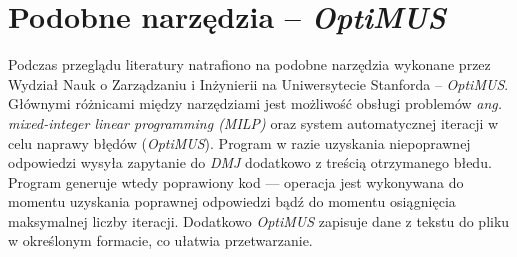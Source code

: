 \section{Podobne narzędzia -- \textit{OptiMUS}\cite{ahmaditeshnizi2023optimus}}

Podczas przeglądu literatury natrafiono na podobne narzędzia wykonane przez Wydział Nauk o Zarządzaniu i Inżynierii na Uniwersytecie Stanforda -- \textit{OptiMUS}. Głównymi różnicami między narzędziami jest możliwość obsługi problemów \textit{ang. mixed-integer linear programming (MILP)} oraz system automatycznej iteracji w celu naprawy błędów (\textit{OptiMUS}). Program w razie uzyskania niepoprawnej odpowiedzi wysyła zapytanie do \textit{DMJ} dodatkowo z treścią otrzymanego błedu. Program generuje wtedy poprawiony kod --- operacja jest wykonywana do momentu uzyskania poprawnej odpowiedzi bądź do momentu osiągnięcia maksymalnej liczby iteracji. Dodatkowo \textit{OptiMUS} zapisuje dane z tekstu do pliku w określonym formacie, co ułatwia przetwarzanie. \label{sec:optimus}


